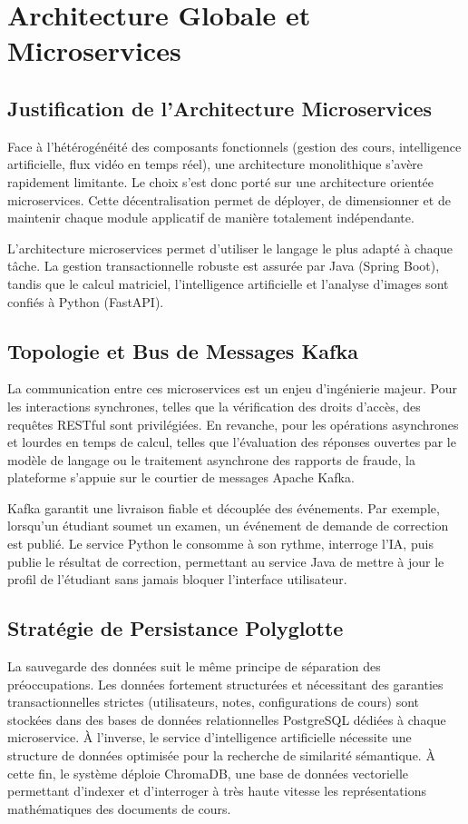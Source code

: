 \chapter{Architecture Globale et Microservices}

\section{Justification de l'Architecture Microservices}
Face à l'hétérogénéité des composants fonctionnels (gestion des cours, intelligence artificielle, flux vidéo en temps réel), une architecture monolithique s'avère rapidement limitante. Le choix s'est donc porté sur une architecture orientée microservices. Cette décentralisation permet de déployer, de dimensionner et de maintenir chaque module applicatif de manière totalement indépendante. 

\begin{infobox}
L'architecture microservices permet d'utiliser le langage le plus adapté à chaque tâche. La gestion transactionnelle robuste est assurée par Java (Spring Boot), tandis que le calcul matriciel, l'intelligence artificielle et l'analyse d'images sont confiés à Python (FastAPI).
\end{infobox}

\section{Topologie et Bus de Messages Kafka}
La communication entre ces microservices est un enjeu d'ingénierie majeur. Pour les interactions synchrones, telles que la vérification des droits d'accès, des requêtes RESTful sont privilégiées. En revanche, pour les opérations asynchrones et lourdes en temps de calcul, telles que l'évaluation des réponses ouvertes par le modèle de langage ou le traitement asynchrone des rapports de fraude, la plateforme s'appuie sur le courtier de messages Apache Kafka. 

Kafka garantit une livraison fiable et découplée des événements. Par exemple, lorsqu'un étudiant soumet un examen, un événement de demande de correction est publié. Le service Python le consomme à son rythme, interroge l'IA, puis publie le résultat de correction, permettant au service Java de mettre à jour le profil de l'étudiant sans jamais bloquer l'interface utilisateur.

\section{Stratégie de Persistance Polyglotte}
La sauvegarde des données suit le même principe de séparation des préoccupations. Les données fortement structurées et nécessitant des garanties transactionnelles strictes (utilisateurs, notes, configurations de cours) sont stockées dans des bases de données relationnelles PostgreSQL dédiées à chaque microservice. À l'inverse, le service d'intelligence artificielle nécessite une structure de données optimisée pour la recherche de similarité sémantique. À cette fin, le système déploie ChromaDB, une base de données vectorielle permettant d'indexer et d'interroger à très haute vitesse les représentations mathématiques des documents de cours.
